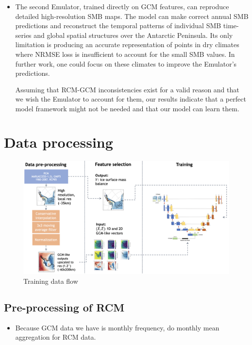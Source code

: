 \documentclass[a4paper,11pt,oneside]{report}
\begin{document}
\begin{itemize}
\begin{itemize}
        \item The second Emulator, trained directly on GCM features, can reproduce detailed high-resolution SMB maps. The model can make correct annual SMB predictions and reconstruct the temporal patterns of individual SMB time-series and global spatial structures over the Antarctic Peninsula. Its only limitation is producing an accurate representation of points in dry climates where NRMSE loss is insufficient to account for the small SMB values. In further work, one could focus on these climates to improve the Emulator's predictions. 
        
        Assuming that RCM-GCM inconsistencies exist for a valid reason and that we wish the Emulator to account for them, our results indicate that a perfect model framework might not be needed and that our model can learn them.  
    \end{itemize}
    
    
\end{itemize}

\cleardoublepage
{}
{}
\printbibliography
\appendix
\chapter{Data processing}
\begin{figure}[!t]
  \centering
  \includegraphics[width=\columnwidth]{images/data-flow.png}
  \caption []{\small Training data flow}
  \vspace{-3mm}
  \label{fig:training-data-flow}
\end{figure}

\section{Pre-processing of RCM}
\begin{itemize}
    \item  Because GCM data we have is monthly frequency, do monthly mean aggregation for RCM data.
\end{itemize}
\end{document}
